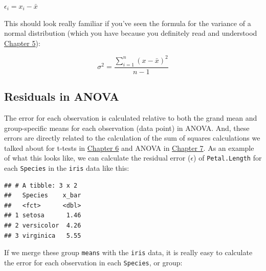 \documentclass[
]{book}
\newenvironment{Shaded}{\begin{snugshade}}{\end{snugshade}}
\newcommand{\CommentTok}[1]{\textcolor[rgb]{0.56,0.35,0.01}{\textit{#1}}}
\newcommand{\DataTypeTok}[1]{\textcolor[rgb]{0.13,0.29,0.53}{#1}}
\newcommand{\KeywordTok}[1]{\textcolor[rgb]{0.13,0.29,0.53}{\textbf{#1}}}
\newcommand{\NormalTok}[1]{#1}
\newcommand{\OperatorTok}[1]{\textcolor[rgb]{0.81,0.36,0.00}{\textbf{#1}}}
\newcommand{\StringTok}[1]{\textcolor[rgb]{0.31,0.60,0.02}{#1}}
\begin{document}
\(\epsilon_i = x_i - \bar{x}\)

This should look really familiar if you've seen the formula for the variance of a normal distribution (which you have because you definitely read and understood \protect\hyperlink{Chapter5}{Chapter 5}):

\[\sigma^2 = \frac{ {\sum_{i=1}^{n} (x - \bar{x})^2}}{n - 1}\]

\hypertarget{residuals-in-anova}{%
\subsection{Residuals in ANOVA}\label{residuals-in-anova}}

The error for each observation is calculated relative to both the grand mean and group-specific means for each observation (data point) in ANOVA. And, these errors are directly related to the calculation of the sum of squares calculations we talked about for t-tests in \protect\hyperlink{Chapter6}{Chapter 6} and ANOVA in \protect\hyperlink{Chapter7}{Chapter 7}. As an example of what this looks like, we can calculate the residual error (\(\epsilon\)) of \texttt{Petal.Length} for each \texttt{Species} in the \texttt{iris} data like this:

\begin{Shaded}
\end{Shaded}

\begin{verbatim}
## # A tibble: 3 x 2
##   Species    x_bar
##   <fct>      <dbl>
## 1 setosa      1.46
## 2 versicolor  4.26
## 3 virginica   5.55
\end{verbatim}

If we merge these group \texttt{means} with the \texttt{iris} data, it is really easy to calculate the error for each observation in each \texttt{Species}, or group:

\begin{Shaded}
\end{Shaded}
\end{document}
